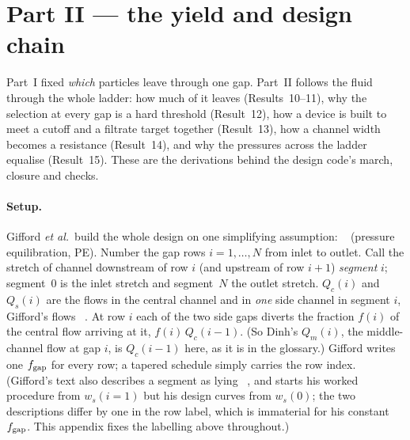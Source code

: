 \section{Part II --- the yield and design chain}
\label{sec:part2}

Part~I fixed \emph{which} particles leave through one gap. Part~II follows the fluid through
the whole ladder: how much of it leaves (Results~10--11), why the selection at every gap is a
hard threshold (Result~12), how a device is built to meet a cutoff and a filtrate target
together (Result~13), how a channel width becomes a resistance (Result~14), and why the
pressures across the ladder equalise (Result~15). These are the derivations behind the
design code's march, closure and checks.

\label{res:march}

\paragraph{Setup.} Gifford \emph{et al.}\ build the whole design on one simplifying assumption:
~\cite[p.~4497]{b1}
(pressure equilibration, PE). Number the gap rows $i=1,\dots,N$ from inlet to outlet. Call the
stretch of channel downstream of row $i$ (and upstream of row $i+1$) \emph{segment} $i$;
segment~$0$ is the inlet stretch and segment~$N$ the outlet stretch. $Q_c(i)$ and $Q_s(i)$ are
the flows in the central channel and in \emph{one} side channel in segment $i$, Gifford's
flows ~\cite[p.~4498]{b1}. At row $i$ each of the two side
gaps diverts the fraction $f(i)$ of the central flow arriving at it, $f(i)\,Q_c(i-1)$. (So
Dinh's $Q_m(i)$, the middle-channel flow at gap $i$, is $Q_c(i-1)$ here, as it is in the
glossary.) Gifford writes one
$f_{\mathrm{gap}}$ for every row; a tapered schedule simply carries the row index. (Gifford's text also
describes a segment as lying ~\cite[p.~4498]{b1}, and
starts his worked procedure from $w_s(i=1)$ but his design curves from $w_s(0)$; the two
descriptions differ by one in the row label, which is immaterial for his constant $f_{\mathrm{gap}}$. This
appendix fixes the labelling above throughout.)

